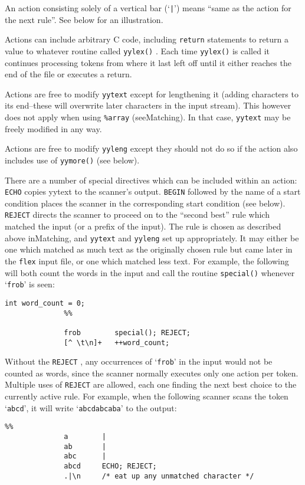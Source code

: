 \documentclass[openany,oneside]{book}
\begin{document}
An action consisting solely of a vertical bar (‘\verb`|`’) means “same as the
action for the next rule”.  See below for an illustration.

Actions can include arbitrary C code, including \verb`return` statements
to return a value to whatever routine called \verb`yylex()` .  Each time \verb`yylex()` is called it continues processing tokens from where it
last left off until it either reaches the end of the file or executes a
return.

Actions are free to modify \verb`yytext` except for lengthening it
(adding characters to its end–these will overwrite later characters in
the input stream).  This however does not apply when using \verb`%array` (seeMatching). In that case, \verb`yytext` may be freely modified
in any way.

Actions are free to modify \verb`yyleng` except they should not do so if
the action also includes use of \verb`yymore()` (see below).

There are a number of special directives which can be included within an
action: \verb`ECHO` copies yytext to the scanner's output. \verb`BEGIN` followed by the name of a start condition places the scanner in the
corresponding start condition (see below). \verb`REJECT` directs the scanner to proceed on to the “second best” rule which
matched the input (or a prefix of the input).  The rule is chosen as
described above inMatching, and \verb`yytext` and \verb`yyleng` set up appropriately.  It may either be one which matched as much text
as the originally chosen rule but came later in the \verb`flex` input
file, or one which matched less text.  For example, the following will
both count the words in the input and call the routine \verb`special()` whenever ‘\verb`frob`’ is seen:
\begin{verbatim}
int word_count = 0;
              %%
          
              frob        special(); REJECT;
              [^ \t\n]+   ++word_count;
\end{verbatim}


Without the \verb`REJECT` , any occurrences of ‘\verb`frob`’ in the input
would not be counted as words, since the scanner normally executes only
one action per token.  Multiple uses of \verb`REJECT` are allowed, each
one finding the next best choice to the currently active rule.  For
example, when the following scanner scans the token ‘\verb`abcd`’, it will
write ‘\verb`abcdabcaba`’ to the output:


\begin{verbatim}
%%
              a        |
              ab       |
              abc      |
              abcd     ECHO; REJECT;
              .|\n     /* eat up any unmatched character */
\end{verbatim}
\end{document}

